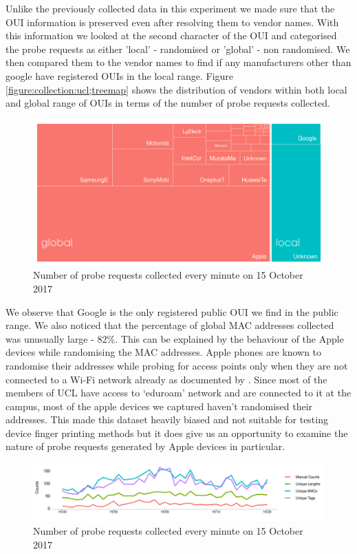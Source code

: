 Unlike the previously collected data in this experiment we made sure that the OUI information is preserved even after resolving them to vendor names.
With this information we looked at the second character of the OUI and categorised the probe requests as either 'local' - randomised or 'global' - non randomised.
We then compared them to the vendor names to find if any manufacturers other than google have registered OUIs in the local range.
Figure \ref{figure:collection:ucl;treemap} shows the distribution of vendors within both local and global range of OUIs in terms of the number of probe requests collected.

\begin{figure}
  \includegraphics{images/ucl-local-treemap.png}
  \caption{Number of probe requests collected every minute on 15 October 2017}
  \label{figure:collection:ucl:treemap}
\end{figure}

We observe that Google is the only registered public OUI we find in the public range. 
We also noticed that the percentage of global MAC addresses collected was unusually large - 82\%.
This can be explained by the behaviour of the Apple devices while randomising the MAC addresses. 
Apple phones are known to randomise their addresses while probing for access points only when they are not connected to a Wi-Fi network already as documented by \citet{vanhoef2016}.
Since most of the members of UCL have access to `eduroam' network and are connected to it at the campus, most of the apple devices we captured haven't randomised their addresses.
This made this dataset heavily biased and not suitable for testing device finger printing methods but it does give us an opportunity to examine the nature of probe requests generated by Apple devices in particular.

\begin{figure}
  \includegraphics{images/ucl-comparison-before.png}
  \caption{Number of probe requests collected every minute on 15 October 2017}
  \label{figure:collection:ucl:before}
\end{figure}

